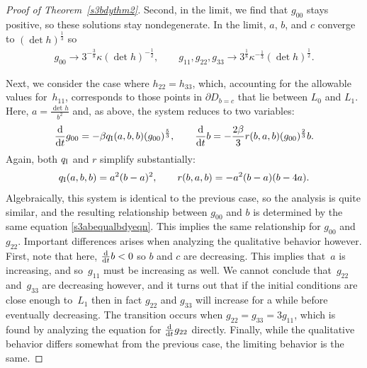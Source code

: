 \documentclass[10pt,a4paper]{amsart}
\numberwithin{equation}{section}
\newcommand{\dtime}{\frac{{\rm d}}{{\rm d} t}} %
\begin{document}
\begin{proof}[Proof of Theorem~\ref{s3bdythm2}]
Second, in the limit, we find that $g_{00}$ stays positive, so these solutions stay nondegenerate. In the limit, $a$, $b$, and $c$ converge to $(\det h)^{\frac{1}{3}}$ so
\begin{gather*}
g_{00} \rightarrow 3^{-\frac{3}{8}} \kappa (\det h)^{-\frac{1}{2}},\qquad
g_{11}, g_{22}, g_{33} \rightarrow 3^{\frac{1}{8}} \kappa^{-\frac{1}{3}} (\det h)^{\frac{1}{2}}.
\end{gather*}

Next, we consider the case where $h_{22} = h_{33}$, which, accounting for the allowable values for~$h_{11}$, corresponds to those points in $\partial D_{b = c}$ that lie between $L_0$ and $L_1$. Here, $a = \frac{\det h}{b^2}$ and, as above, the system reduces to two variables:
\begin{gather*}
\dtime g_{00} = - \beta q_{\rm I}(a, b, b) (g_{00})^{\frac{5}{3}},\qquad
\dtime b = - \frac{2 \beta}{3} r(b, a, b) (g_{00})^{\frac{2}{3}} b.
\end{gather*}
Again, both $q_{\rm I}$ and $r$ simplify substantially:
\begin{gather*}
q_{\rm I}(a, b, b) = a^2 (b - a)^2,\qquad
r(b, a, b) = -a^2 (b - a) (b - 4a).
\end{gather*}
Algebraically, this system is identical to the previous case, so the analysis is quite similar, and the resulting relationship between $g_{00}$ and $b$ is determined by the same equation \eqref{s3abequalbdyeqn}. This implies the same relationship for $g_{00}$ and $g_{22}$. Important differences arises when analyzing the qualitative behavior however. First, note that here, $\dtime b < 0$ so $b$ and $c$ are decreasing. This implies that~$a$ is increasing, and so~$g_{11}$ must be increasing as well. We cannot conclude that~$g_{22}$ and~$g_{33}$ are decreasing however, and it turns out that if the initial conditions are close enough to~$L_1$ then in fact $g_{22}$ and $g_{33}$ will increase for a while before eventually decreasing. The transition occurs when $g_{22} = g_{33} = 3g_{11}$, which is found by analyzing the equation for $\dtime g_{22}$ directly. Finally, while the qualitative behavior differs somewhat from the previous case, the limiting behavior is the same.
\end{proof}
\end{document}
